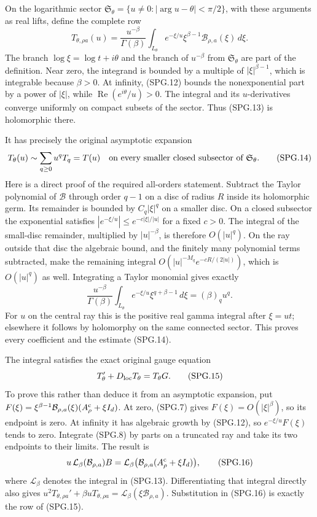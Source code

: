 On the logarithmic sector
\(\mathfrak S_\theta=\{u\ne0:|\arg u-\theta|<\pi/2\}\),
with these arguments as real lifts, define the complete row
\[
 T_{\theta,\rho a}(u)
  =\frac{u^{-\beta}}{\Gamma(\beta)}
       \int_{L_\theta} e^{-\xi/u}\xi^{\beta-1}
                         \mathcal B_{\rho,a}(\xi)\,d\xi.
 \tag{SPG.13}\label{eq:spg-Laplace}
\]
The branch \(\log\xi=\log t+i\theta\) and the branch of
\(u^{-\beta}\) from \(\mathfrak S_\theta\) are part of the
definition. Near zero, the integrand is bounded by a multiple of
\(|\xi|^{\beta-1}\), which is integrable because \(\beta>0\).
At infinity, (SPG.12) bounds the nonexponential part by a power of
\(|\xi|\), while
\(\operatorname{Re}(e^{i\theta}/u)>0\). The integral and its
\(u\)-derivatives converge uniformly on compact subsets of the
sector. Thus (SPG.13) is holomorphic there.

It has precisely the original asymptotic expansion
\[
 T_{\theta}(u)\sim\sum_{q\ge0}u^qT_q=T(u)
    \quad\hbox{on every smaller closed subsector of }
             \mathfrak S_\theta.
 \tag{SPG.14}\label{eq:spg-asymptotic}
\]
Here is a direct proof of the required all-orders statement. Subtract
the Taylor polynomial of \(\mathcal B\) through order \(q-1\)
on a disc of radius \(R\) inside its holomorphic germ. Its remainder
is bounded by \(C_q|\xi|^q\) on a smaller disc. On a closed
subsector the exponential satisfies
\(|e^{-\xi/u}|\le e^{-c|\xi|/|u|}\) for a fixed \(c>0\).
The integral of the small-disc remainder, multiplied by
\(|u|^{-\beta}\), is therefore \(O(|u|^q)\). On the ray
outside that disc the algebraic bound, and the finitely many
polynomial terms subtracted, make the remaining integral
\(O(|u|^{-M_q}e^{-cR/(2|u|)})\), which is \(O(|u|^q)\)
as well. Integrating a Taylor monomial gives exactly
\[
 \frac{u^{-\beta}}{\Gamma(\beta)}
     \int_{L_\theta}e^{-\xi/u}\xi^{q+\beta-1}\,d\xi
           =(\beta)_q u^q.
\]
For \(u\) on the central ray this is the positive real gamma
integral after \(\xi=ut\); elsewhere it follows by holomorphy
on the same connected sector. This proves every coefficient and
the estimate (SPG.14).

The integral satisfies the exact original gauge equation
\[
 T_\theta'+D_{\rm loc}T_\theta=T_\theta G.
 \tag{SPG.15}\label{eq:spg-exact-gauge}
\]
To prove this rather than deduce it from an asymptotic expansion,
put \(F(\xi)=\xi^{\beta-1}\mathcal B_{\rho,a}(\xi)
(A_\rho^{\rm c}+\xi I_d)\). At zero, (SPG.7) gives
\(F(\xi)=O(|\xi|^\beta)\), so its endpoint is zero. At infinity
it has algebraic growth by (SPG.12), so
\(e^{-\xi/u}F(\xi)\) tends to zero. Integrate (SPG.8) by
parts on a truncated ray and take its two endpoints to their limits.
The result is
\[
 u\,\mathcal L_\beta(\mathcal B_{\rho,a})B
       =\mathcal L_\beta\bigl(
                  \mathcal B_{\rho,a}(A_\rho^{\rm c}+\xi I_d)
                              \bigr),
 \tag{SPG.16}\label{eq:spg-integration-parts}
\]
where \(\mathcal L_\beta\) denotes the integral in (SPG.13).
Differentiating that integral directly also gives
\(u^2T_{\theta,\rho a}'+\beta uT_{\theta,\rho a}
       =\mathcal L_\beta(\xi\mathcal B_{\rho,a})\).
Substitution in (SPG.16) is exactly the row of (SPG.15).

